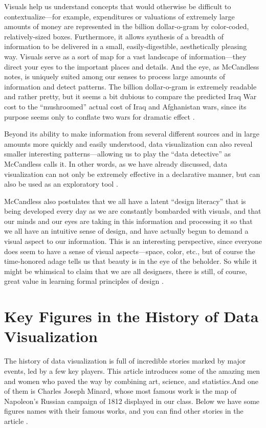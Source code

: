 \documentclass[]{book}
\theoremstyle{definition}
\theoremstyle{definition}
\theoremstyle{definition}
\theoremstyle{remark}
\begin{document}
Visuals help us understand concepts that would otherwise be difficult to
contextualize---for example, expenditures or valuations of extremely
large amounts of money are represented in the billion dollar-o-gram by
color-coded, relatively-sized boxes. Furthermore, it allows synthesis of
a breadth of information to be delivered in a small, easily-digestible,
aesthetically pleasing way. Visuals serve as a sort of map for a vast
landscape of information---they direct your eyes to the important places
and details. And the eye, as McCandless notes, is uniquely suited among
our senses to process large amounts of information and detect patterns.
The billion dollar-o-gram is extremely readable and rather pretty, but
it seems a bit dubious to compare the predicted Iraq War cost to the
``mushroomed'' actual cost of Iraq and Afghanistan wars, since its
purpose seems only to conflate two wars for dramatic effect
\citep{viz_ted}.

Beyond its ability to make information from several different sources
and in large amounts more quickly and easily understood, data
visualization can also reveal smaller interesting patterns---allowing us
to play the ``data detective'' as McCandless calls it. In other words,
as we have already discussed, data visualization can not only be
extremely effective in a declarative manner, but can also be used as an
exploratory tool \citep{viz_ted}.

McCandless also postulates that we all have a latent ``design literacy''
that is being developed every day as we are constantly bombarded with
visuals, and that our minds and our eyes are taking in this information
and processing it so that we all have an intuitive sense of design, and
have actually begun to demand a visual aspect to our information. This
is an interesting perspective, since everyone does seem to have a sense
of visual aspects---space, color, etc., but of course the time-honored
adage tells us that beauty is in the eye of the beholder. So while it
might be whimsical to claim that we are all designers, there is still,
of course, great value in learning formal principles of design
\citep{viz_ted}.

\section{Key Figures in the History of Data
Visualization}\label{key-figures-in-the-history-of-data-visualization}

The history of data visualization is full of incredible stories marked
by major events, led by a few key players. This article introduces some
of the amazing men and women who paved the way by combining art,
science, and statistics.And one of them is Charles Joseph Minard, whose
most famous work is the map of Napoleon's Russian campaign of 1812
displayed in our class. Below we have some figures names with their
famous works, and you can find other stories in the article
\citep{history_viz}.
\end{document}
